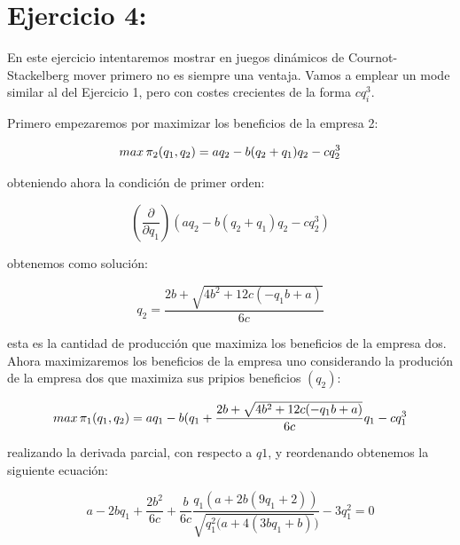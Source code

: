 \documentclass{article}
\begin{document}
\section{Ejercicio 4:}

En este ejercicio intentaremos mostrar en juegos dinámicos de Cournot-Stackelberg mover primero no es siempre una ventaja. Vamos a emplear un mode similar al del Ejercicio 1, pero con costes crecientes de la forma $cq_i^3$.

\vspace{5mm}

Primero empezaremos por maximizar los beneficios de la empresa 2:

$$max\thinspace \pi_2(q_1,q_2)=aq_2-b(q_2+q_1)q_2-cq^3_2$$

obteniendo ahora la condici\'on de primer orden:

$$(\frac{\partial}{\partial q_1})(aq_2-b(q_2+q_1)q_2-cq^3_2)$$

obtenemos como soluci\'on:

$$q_2=\frac{2b+\sqrt{4b^2+12c(-q_1b+a)}}{6c}$$

esta es la cantidad de producci\'on que maximiza los beneficios de la empresa dos. Ahora maximizaremos los beneficios de la empresa uno considerando la produci\'on de la empresa dos que maximiza sus pripios beneficios $(q_2)$:

$$max\thinspace \pi_1(q_1,q_2)=aq_1-b(q_1+\frac{2b+\sqrt{4b^2+12c(-q_1b+a)}}{6c}q_1-cq^3_1$$

realizando la derivada parcial, con respecto a $q1$, y reordenando obtenemos la siguiente ecuación:

$$a-2bq_1+\frac{2b^2}{6c}+\frac{b}{6c}\frac{q_1(a+2b(9q_1+2))}{\sqrt{q_1^2(a+4(3bq_1+b)})}-3q_1^2=0$$
\end{document}
